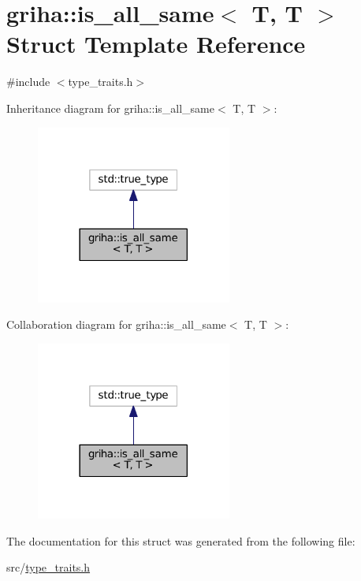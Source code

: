\hypertarget{structgriha_1_1is__all__same_3_01_t_00_01_t_01_4}{}\section{griha\+:\+:is\+\_\+all\+\_\+same$<$ T, T $>$ Struct Template Reference}
\label{structgriha_1_1is__all__same_3_01_t_00_01_t_01_4}


{\ttfamily \#include $<$type\+\_\+traits.\+h$>$}



Inheritance diagram for griha\+:\+:is\+\_\+all\+\_\+same$<$ T, T $>$\+:
\nopagebreak
\begin{figure}[H]
\begin{center}
\leavevmode
\includegraphics[width=182pt]{structgriha_1_1is__all__same_3_01_t_00_01_t_01_4__inherit__graph}
\end{center}
\end{figure}


Collaboration diagram for griha\+:\+:is\+\_\+all\+\_\+same$<$ T, T $>$\+:
\nopagebreak
\begin{figure}[H]
\begin{center}
\leavevmode
\includegraphics[width=182pt]{structgriha_1_1is__all__same_3_01_t_00_01_t_01_4__coll__graph}
\end{center}
\end{figure}


The documentation for this struct was generated from the following file\+:\begin{DoxyCompactItemize}
\item 
src/\hyperlink{type__traits_8h}{type\+\_\+traits.\+h}\end{DoxyCompactItemize}
